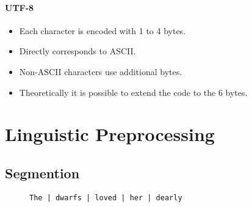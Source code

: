             \subsubsection{UTF-8} %
                \begin{itemize}
                	\item Each character is encoded with 1 to 4 bytes.
                	\item Directly corresponds to ASCII.
                	\item Non-ASCII characters use additional bytes.
                	\item Theoretically it is possible to extend the code to the 6 bytes.
                \end{itemize}

\chapter{Linguistic Preprocessing} %
	\label{c:linguisticpreprocessing}

    \section{Segmention} %
    	\begin{figure}[H]
    		\centering
    		\texttt{The | dwarfs | loved | her | dearly}
    	\end{figure}


